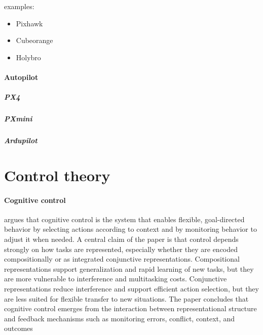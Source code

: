 \documentclass{book}
\begin{document}
    examples:
    \begin{itemize}
        \item Pixhawk
        \item Cubeorange
        \item Holybro
    \end{itemize}

\subsubsection{Autopilot}
    \paragraph{PX4}
        \paragraph{PXmini}
    \paragraph{Ardupilot}

\chapter{Control theory}


\subsubsection{Cognitive control}
        \cite{badre-2025-cognitive-control} argues that cognitive control is the system that enables flexible, goal-directed behavior by selecting actions according to context and by monitoring behavior to adjust it when needed. A central claim of the paper is that control depends strongly on how tasks are represented, especially whether they are encoded compositionally or as integrated conjunctive representations. Compositional representations support generalization and rapid learning of new tasks, but they are more vulnerable to interference and multitasking costs. Conjunctive representations reduce interference and support efficient action selection, but they are less suited for flexible transfer to new situations. The paper concludes that cognitive control emerges from the interaction between representational structure and feedback mechanisms such as monitoring errors, conflict, context, and outcomes

\end{document}
